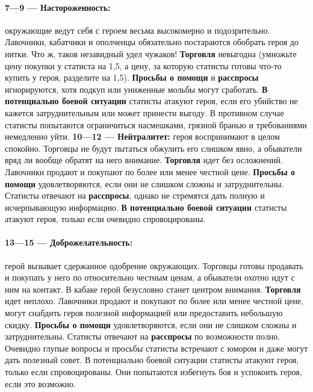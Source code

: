 \paragraph{7—9 — Настороженность:} окружающие ведут себя с героем весьма высокомерно и подозрительно. Лавочники, кабатчики и ополченцы обязательно постараются обобрать героя до нитки. Что ж, таков незавидный удел чужаков!
\textbf{Торговля} невыгодна (умножьте цену покупки у статиста на 1,5, а цену, за которую статисты готовы что-то купить у героя, разделите на 1,5).
\textbf{Просьбы о помощи} и \textbf{расспросы} игнорируются, хотя подкуп или униженные мольбы могут сработать.
\textbf{В потенциально боевой ситуации} статисты атакуют героя, если его убийство не кажется затруднительным или может принести выгоду. В противном случае статисты попытаются ограничиться насмешками, грязной бранью и требованиями немедленно уйти.
\textbf{10—12 — Нейтралитет:} героя воспринимают в целом спокойно. Торговцы не будут пытаться обжулить его слишком явно, а обыватели вряд ли вообще обратят на него внимание.
\textbf{Торговля} идет без осложнений. Лавочники продают и покупают по более или менее честной цене.
\textbf{Просьбы о помощи} удовлетворяются, если они не слишком
сложны и затруднительны. Статисты отвечают на \textbf{расспросы}, однако не стремятся дать полную и исчерпывающую информацию. 
\textbf{В потенциально боевой ситуации} статисты атакуют героя, только если очевидно спровоцированы.
\paragraph{13—15 — Доброжелательность:} герой вызывает сдержанное одобрение окружающих. Торговцы готовы продавать и покупать у него по относительно честным ценам, а обыватели охотно идут с ним на контакт. В кабаке герой безусловно станет центром внимания.
\textbf{Торговля} идет неплохо. Лавочники продают и покупают по более или менее честной цене, могут снабдить героя полезной информацией или предоставить небольшую скидку.
\textbf{Просьбы о помощи} удовлетворяются, если они не слишком сложны и затруднительны. Статисты отвечают на \textbf{расспросы} по возможности полно. Очевидно глупые вопросы и просьбы статисты встречают с юмором и даже могут дать полезный совет. В потенциально боевой ситуации статисты атакуют героя, только если спровоцированы. Они попытаются избегнуть боя и успокоить героя, если это возможно.
